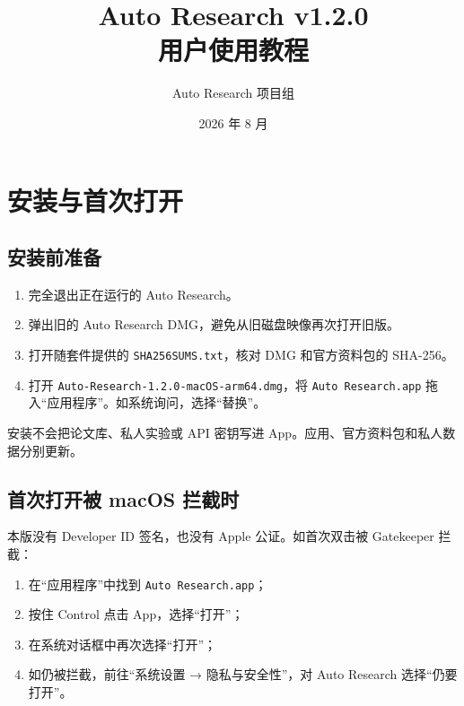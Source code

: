 \documentclass[11pt,a4paper]{ctexart}
\title{Auto Research v1.2.0\\用户使用教程}
\author{Auto Research 项目组}
\date{2026 年 8 月}
\begin{document}
\maketitle

\begin{center}
\end{center}

\tableofcontents
\newpage

\section{安装与首次打开}

\subsection{安装前准备}
\begin{enumerate}
  \item 完全退出正在运行的 Auto Research。
  \item 弹出旧的 Auto Research DMG，避免从旧磁盘映像再次打开旧版。
  \item 打开随套件提供的 \texttt{SHA256SUMS.txt}，核对 DMG 和官方资料包的 SHA-256。
  \item 打开 \texttt{Auto-Research-1.2.0-macOS-arm64.dmg}，将 \texttt{Auto Research.app} 拖入“应用程序”。如系统询问，选择“替换”。
\end{enumerate}

安装不会把论文库、私人实验或 API 密钥写进 App。应用、官方资料包和私人数据分别更新。

\subsection{首次打开被 macOS 拦截时}

本版没有 Developer ID 签名，也没有 Apple 公证。如首次双击被 Gatekeeper 拦截：

\begin{enumerate}
  \item 在“应用程序”中找到 \texttt{Auto Research.app}；
  \item 按住 Control 点击 App，选择“打开”；
  \item 在系统对话框中再次选择“打开”；
  \item 如仍被拦截，前往“系统设置 → 隐私与安全性”，对 Auto Research 选择“仍要打开”。
\end{enumerate}
\end{document}

